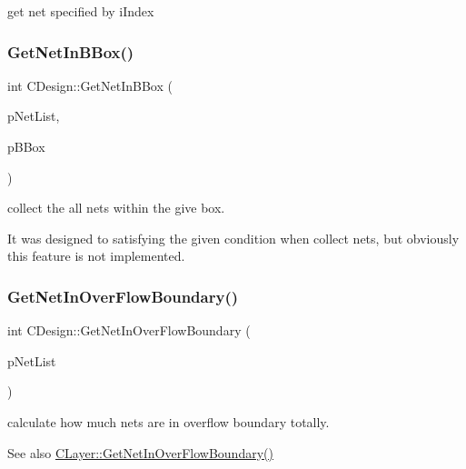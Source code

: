get net specified by i\+Index 

\mbox{\label{classCDesign_a5ab5f93449266153a28914c319626289}} 
\subsubsection{\texorpdfstring{GetNetInBBox()}{GetNetInBBox()}}
{\footnotesize\ttfamily int C\+Design\+::\+Get\+Net\+In\+B\+Box (\begin{DoxyParamCaption}\item[{vector$<$ \mbox{\hyperlink{classCNet}{C\+Net}} $\ast$ $>$ $\ast$}]{p\+Net\+List,  }\item[{\mbox{\hyperlink{classCBBox}{C\+B\+Box}} $\ast$}]{p\+B\+Box }\end{DoxyParamCaption})}



collect the all nets within the give box. 

It was designed to satisfying the given condition when collect nets, but obviously this feature is not implemented. \mbox{\label{classCDesign_ab3fcdbedca2a1f107507ec6bd7f4677a}} 
\subsubsection{\texorpdfstring{GetNetInOverFlowBoundary()}{GetNetInOverFlowBoundary()}}
{\footnotesize\ttfamily int C\+Design\+::\+Get\+Net\+In\+Over\+Flow\+Boundary (\begin{DoxyParamCaption}\item[{hash\+\_\+map$<$ \mbox{\hyperlink{BoxRouter_8h_a280feb883e9d4a7edcc69c8bcb9f38f2}{A\+D\+D\+R\+E\+SS}}, int $>$ $\ast$}]{p\+Net\+List }\end{DoxyParamCaption})}



calculate how much nets are in overflow boundary totally. 

\begin{DoxySeeAlso}{See also}
\mbox{\hyperlink{classCLayer_a4d36fe6154f539a253380daf5ed0bedc}{C\+Layer\+::\+Get\+Net\+In\+Over\+Flow\+Boundary()}} 
\end{DoxySeeAlso}
\mbox{\label{classCDesign_ac4221f754cb8ba12ac6344df3ca31d26}} 
